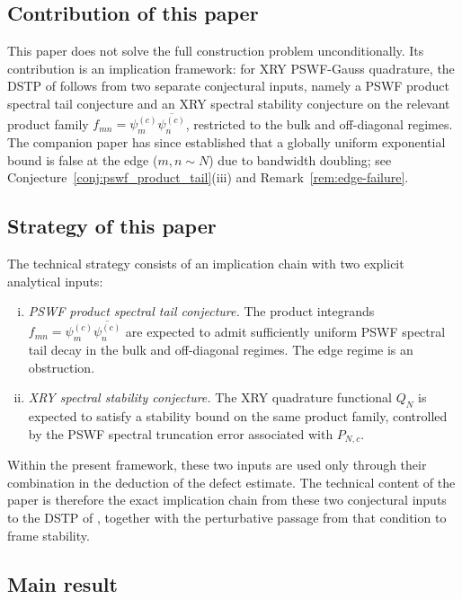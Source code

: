 \documentclass[12pt,a4paper]{amsart}
\theoremstyle{definition}
\newcommand{\PN}{P_{N,c}}
\begin{document}
\subsection*{Contribution of this paper}

This paper does not solve the full construction problem unconditionally.
Its contribution is an implication framework: for XRY PSWF-Gauss quadrature,
the DSTP of \cite{PaperI} follows from two separate conjectural
inputs, namely a PSWF product spectral tail conjecture and an XRY spectral
stability conjecture on the relevant product family
$f_{mn}=\psi_m^{(c)}\overline{\psi_n^{(c)}}$, restricted to the bulk
and off-diagonal regimes.
The companion paper \cite{PaperIII} has since established that a
globally uniform exponential bound is false at the edge ($m,n\sim N$)
due to bandwidth doubling; see Conjecture~\ref{conj:pswf_product_tail}(iii)
and Remark~\ref{rem:edge-failure}.

\subsection*{Strategy of this paper}

The technical strategy consists of an implication chain with two explicit
analytical inputs:
\begin{enumerate}[(i)]
\item \emph{PSWF product spectral tail conjecture.} The product integrands
  $f_{mn}=\psi_m^{(c)}\overline{\psi_n^{(c)}}$ are expected to admit
  sufficiently uniform PSWF spectral tail decay in the bulk and
  off-diagonal regimes. The edge regime is an obstruction.
\item \emph{XRY spectral stability conjecture.} The XRY quadrature
  functional $Q_N$ is expected to satisfy a stability bound on the same
  product family, controlled by the PSWF spectral truncation error
  associated with $\PN$.
\end{enumerate}
Within the present framework, these two inputs are used only through their
combination in the deduction of the defect estimate. The technical content
of the paper is therefore the exact implication chain from these two
conjectural inputs to the DSTP of \cite{PaperI}, together
with the perturbative passage from that condition to frame stability.

\subsection*{Main result}
\end{document}
